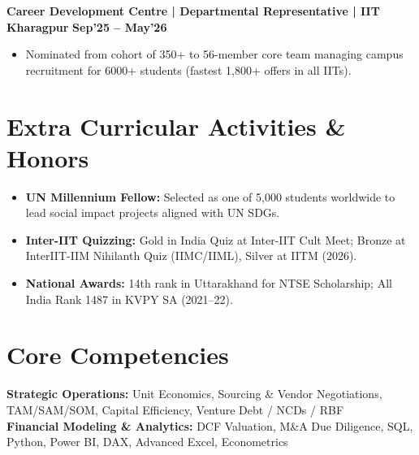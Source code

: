 \documentclass[10pt, a4paper]{article}
\newenvironment{achievelist}{
  \begin{itemize}[leftmargin=1.2em, itemsep=0.5pt, parsep=0pt, topsep=1pt]
    \small
}{
  \end{itemize}
  \vspace{-2pt}
}
\newcommand{\achieve}[1]{\item #1}
\begin{document}
\textbf{Career Development Centre | Departmental Representative | IIT Kharagpur} \hfill \textbf{\small Sep'25 -- May'26}
\begin{achievelist}
  \achieve{Nominated from cohort of 350+ to 56-member core team managing campus recruitment for 6000+ students (fastest 1,800+ offers in all IITs).}
\end{achievelist}

\vspace{-2pt}

\section{Extra Curricular Activities \& Honors}

\begin{itemize}[leftmargin=1.2em, itemsep=0.5pt, parsep=0pt, topsep=1pt]
  \small
  \item \textbf{UN Millennium Fellow:} Selected as one of 5,000 students worldwide to lead social impact projects aligned with UN SDGs.
  \item \textbf{Inter-IIT Quizzing:} Gold in India Quiz at Inter-IIT Cult Meet; Bronze at InterIIT-IIM Nihilanth Quiz (IIMC/IIML), Silver at IITM (2026).
  \item \textbf{National Awards:} 14th rank in Uttarakhand for NTSE Scholarship; All India Rank 1487 in KVPY SA (2021--22).
\end{itemize}

\vspace{-2pt}

\section{Core Competencies}

\noindent
\textbf{Strategic Operations:} Unit Economics, Sourcing \& Vendor Negotiations, TAM/SAM/SOM, Capital Efficiency, Venture Debt / NCDs / RBF \\[2pt]
\textbf{Financial Modeling \& Analytics:} DCF Valuation, M\&A Due Diligence, SQL, Python, Power BI, DAX, Advanced Excel, Econometrics
\end{document}
